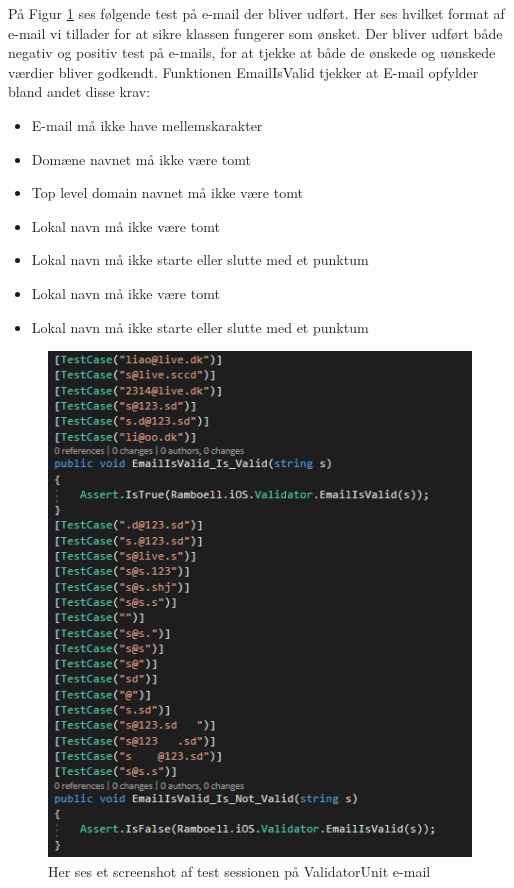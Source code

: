 På Figur \ref{fig:ValidatorUnitEmail} ses følgende test på e-mail der bliver udført. Her ses hvilket format af e-mail vi tillader for at sikre klassen fungerer som ønsket.
Der bliver udført både negativ og positiv test på e-mails, for at tjekke at både de ønskede og uønskede værdier bliver godkendt. Funktionen EmailIsValid tjekker at E-mail opfylder bland andet disse krav:\\
\begin{itemize}
	\item E-mail må ikke have mellemskarakter
	\item Domæne navnet må ikke være tomt
	\item Top level domain navnet\cite{TLD} må ikke være tomt
	\item Lokal navn må ikke være tomt
	\item Lokal navn må ikke starte eller slutte med et punktum
	\item Lokal navn må ikke være tomt
	\item Lokal navn må ikke starte eller slutte med et punktum
	
\end{itemize}

\begin{figure}[H]
	\centering
	\includegraphics[width=0.6\linewidth]{Unit/ValidatorUnitEmail.PNG}
	\caption{Her ses et screenshot af test sessionen på ValidatorUnit e-mail}
	\label{fig:ValidatorUnitEmail}
\end{figure}

\clearpage


